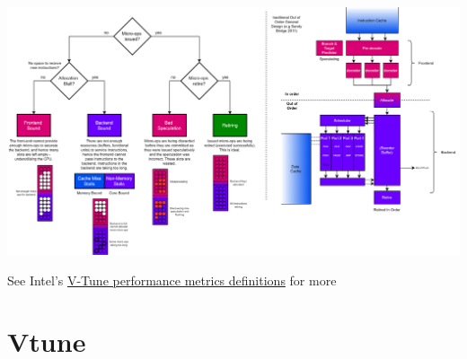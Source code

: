 \begin{center}
    \includegraphics[width=\textwidth]{profiling/images/bottleneck_analysis.drawio.png}
\end{center}
See Intel's \href{https://www.intel.com/content/www/us/en/develop/documentation/vtune-help/top/reference/cpu-metrics-reference.html}{V-Tune performance metrics definitions} for more

\section{Vtune}
\unfinished
